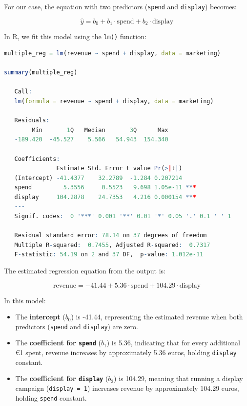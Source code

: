 \documentclass[
]{book}
\newcommand{\passthrough}[1]{#1}
\providecommand{\tightlist}{%
  \setlength{\itemsep}{0pt}\setlength{\parskip}{0pt}}
\theoremstyle{definition}
\theoremstyle{definition}
\theoremstyle{definition}
\theoremstyle{definition}
\theoremstyle{remark}
\begin{document}
For our case, the equation with two predictors (\passthrough{\lstinline!spend!} and \passthrough{\lstinline!display!}) becomes:

\[
\hat{y} = b_0 + b_1 \cdot \text{spend} + b_2 \cdot \text{display}
\]

In R, we fit this model using the \passthrough{\lstinline!lm()!} function:

\begin{lstlisting}[language=R]
multiple_reg = lm(revenue ~ spend + display, data = marketing)

summary(multiple_reg)
   
   Call:
   lm(formula = revenue ~ spend + display, data = marketing)
   
   Residuals:
        Min       1Q   Median       3Q      Max 
   -189.420  -45.527    5.566   54.943  154.340 
   
   Coefficients:
               Estimate Std. Error t value Pr(>|t|)    
   (Intercept) -41.4377    32.2789  -1.284 0.207214    
   spend         5.3556     0.5523   9.698 1.05e-11 ***
   display     104.2878    24.7353   4.216 0.000154 ***
   ---
   Signif. codes:  0 '***' 0.001 '**' 0.01 '*' 0.05 '.' 0.1 ' ' 1
   
   Residual standard error: 78.14 on 37 degrees of freedom
   Multiple R-squared:  0.7455, Adjusted R-squared:  0.7317 
   F-statistic: 54.19 on 2 and 37 DF,  p-value: 1.012e-11
\end{lstlisting}

The estimated regression equation from the output is:

\[
\text{revenue} = -41.44 + 5.36 \cdot \text{spend} + 104.29 \cdot \text{display}
\]

In this model:

\begin{itemize}
\tightlist
\item
  The \textbf{intercept} (\(b_0\)) is -41.44, representing the estimated revenue when both predictors (\passthrough{\lstinline!spend!} and \passthrough{\lstinline!display!}) are zero.\\
\item
  The \textbf{coefficient for \passthrough{\lstinline!spend!}} (\(b_1\)) is 5.36, indicating that for every additional €1 spent, revenue increases by approximately 5.36 euros, holding \passthrough{\lstinline!display!} constant.\\
\item
  The \textbf{coefficient for \passthrough{\lstinline!display!}} (\(b_2\)) is 104.29, meaning that running a display campaign (\passthrough{\lstinline!display = 1!}) increases revenue by approximately 104.29 euros, holding \passthrough{\lstinline!spend!} constant.
\end{itemize}
\end{document}
